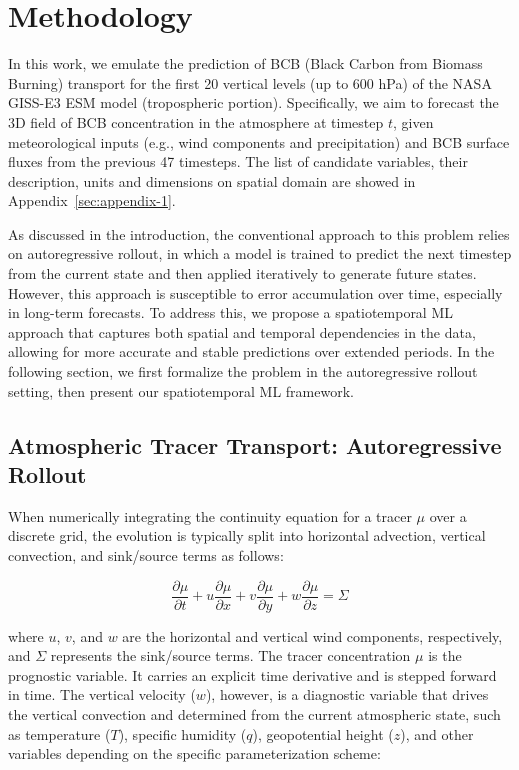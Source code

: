 \documentclass[11pt]{article}
\begin{document}
\section{Methodology}
    In this work, we emulate the prediction of BCB (Black Carbon from Biomass Burning) transport for the first 20 vertical levels (up to 600 hPa) of the NASA GISS-E3 ESM model (tropospheric portion). Specifically, we aim to forecast the 3D field of BCB concentration in the atmosphere at timestep $t$, given meteorological inputs (e.g., wind components and precipitation) and BCB surface fluxes from the previous 47 timesteps. The list of candidate variables, their description, units and dimensions on spatial domain are showed in Appendix~\ref{sec:appendix-1}.

   As discussed in the introduction, the conventional approach to this problem relies on autoregressive rollout,  in which a model is trained to predict the next timestep from the current state and then applied iteratively to generate future states. However, this approach is susceptible to error accumulation over time, especially in long-term forecasts. To address this, we propose a spatiotemporal ML approach that captures both spatial and temporal dependencies in the data, allowing for more accurate and stable predictions over extended periods. In the following section, we first formalize the problem in the autoregressive rollout setting, then present our spatiotemporal ML framework.

    \subsection{Atmospheric Tracer Transport: Autoregressive Rollout}
        When numerically integrating the continuity equation for a tracer $\mu$ over a discrete grid, the evolution is typically split into horizontal advection, vertical convection, and sink/source terms as follows: 

        \begin{equation}
        \frac{\partial\mu}{\partial t} + u\frac{\partial\mu}{\partial x} + v\frac{\partial\mu}{\partial y} + w\frac{\partial\mu}{\partial z} = \Sigma
        \label{eq:transport-formula}
        \end{equation}

        \noindent
        where $u$, $v$, and $w$ are the horizontal and vertical wind components, respectively, and $\Sigma$ represents the sink/source terms. The tracer concentration $\mu$ is the prognostic variable. It carries an explicit time derivative and is stepped forward in time. The vertical velocity ($w$), however, is a diagnostic variable that drives the vertical convection and determined from the current atmospheric state, such as temperature ($T$), specific humidity ($q$), geopotential height ($z$), and other variables depending on the specific parameterization scheme:
\end{document}
